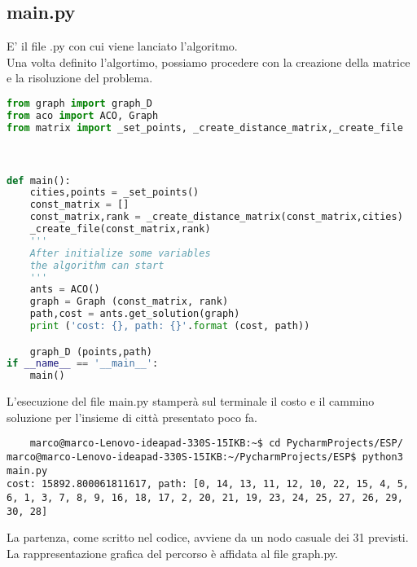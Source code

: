 \documentclass[a4paper,12pt]{report}
\begin{document}
\subsection{main.py}
E' il file .py con cui viene lanciato l'algoritmo.\\
Una volta definito l'algortimo, possiamo procedere con la creazione della matrice e la risoluzione del problema.
\begin{lstlisting}[language=Python]
    from graph import graph_D
from aco import ACO, Graph
from matrix import _set_points, _create_distance_matrix,_create_file



def main():
    cities,points = _set_points()
    const_matrix = []
    const_matrix,rank = _create_distance_matrix(const_matrix,cities)
    _create_file(const_matrix,rank)
    '''
    After initialize some variables
    the algorithm can start 
    '''
    ants = ACO()
    graph = Graph (const_matrix, rank)
    path,cost = ants.get_solution(graph)
    print ('cost: {}, path: {}'.format (cost, path))

    graph_D (points,path)
if __name__ == '__main__':
    main()
\end{lstlisting}
L'esecuzione del file main.py stamperà sul terminale il costo e il cammino soluzione per l'insieme di città presentato poco fa.
\begin{lstlisting}
    marco@marco-Lenovo-ideapad-330S-15IKB:~$ cd PycharmProjects/ESP/
marco@marco-Lenovo-ideapad-330S-15IKB:~/PycharmProjects/ESP$ python3 main.py
cost: 15892.800061811617, path: [0, 14, 13, 11, 12, 10, 22, 15, 4, 5, 6, 1, 3, 7, 8, 9, 16, 18, 17, 2, 20, 21, 19, 23, 24, 25, 27, 26, 29, 30, 28]
\end{lstlisting}
La partenza, come scritto nel codice, avviene da un nodo casuale dei 31 previsti.
La rappresentazione grafica del percorso è affidata al file graph.py.\\
\end{document}
